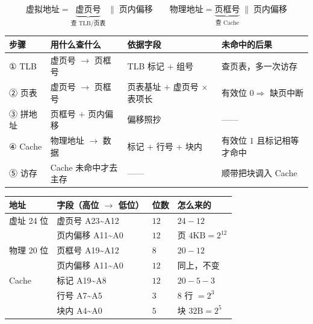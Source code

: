 \documentclass[11pt,a4paper]{ctexart}
\begin{document}

\[
\text{虚拟地址}=\underbrace{\text{虚页号}}_{\text{查 TLB/页表}}\;\|\;\text{页内偏移}\qquad \text{物理地址}=\underbrace{\text{页框号}}_{\text{查 Cache}}\;\|\;\text{页内偏移}
\]



\begin{center}\small
\begin{tabularx}{\linewidth}{@{}>{\raggedright\arraybackslash}X>{\raggedright\arraybackslash}X>{\raggedright\arraybackslash}X>{\raggedright\arraybackslash}X@{}}
\toprule
步骤 & 用什么查什么 & 依据字段 & 未命中的后果 \\
\midrule
① TLB & 虚页号 $\to$ 页框号 & TLB 标记 $+$ 组号 & 查页表，多一次访存 \\
② 页表 & 虚页号 $\to$ 页框号 & 页表基址 $+$ 虚页号 $\times$ 表项长 & 有效位 $0\Rightarrow$ 缺页中断 \\
③ 拼地址 & 页框号 $+$ 页内偏移 & 偏移照抄 & —— \\
④ Cache & 物理地址 $\to$ 数据 & 标记 $+$ 行号 $+$ 块内 & 有效位 $1$ 且标记相等才命中 \\
⑤ 访存 & Cache 未命中才去主存 & —— & 顺带把块调入 Cache \\
\bottomrule
\end{tabularx}
\end{center}



\begin{center}\small
\begin{tabularx}{\linewidth}{@{}>{\raggedright\arraybackslash}X>{\raggedright\arraybackslash}X>{\raggedright\arraybackslash}X>{\raggedright\arraybackslash}X@{}}
\toprule
地址 & 字段（高位 $\to$ 低位） & 位数 & 怎么来的 \\
\midrule
虚址 24 位 & 虚页号 A23\textasciitilde{}A12 & $12$ & $24-12$ \\
 & 页内偏移 A11\textasciitilde{}A0 & $12$ & 页 $4\mathrm{KB}=2^{12}$ \\
物理 20 位 & 页框号 A19\textasciitilde{}A12 & $8$ & $20-12$ \\
 & 页内偏移 A11\textasciitilde{}A0 & $12$ & 同上，不变 \\
Cache & 标记 A19\textasciitilde{}A8 & $12$ & $20-5-3$ \\
 & 行号 A7\textasciitilde{}A5 & $3$ & $8$ 行 $=2^{3}$ \\
 & 块内 A4\textasciitilde{}A0 & $5$ & 块 $32\mathrm{B}=2^{5}$ \\
\bottomrule
\end{tabularx}
\end{center}
\end{document}
